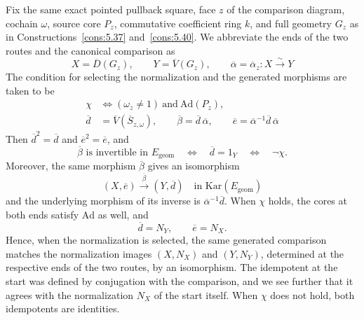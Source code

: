 \begin{theorem}\label{thm:6.16}

Fix the same exact pointed pullback square, face $z$ of the comparison diagram,
cochain $\omega$, source core $P_z$, commutative coefficient ring $k$, and
full geometry $G_z$ as in Constructions~\ref{cons:5.37} and~\ref{cons:5.40}.
We abbreviate the ends of the two routes and the canonical comparison as
\begin{equation*}
X=\overline D(G_z),\qquad Y=\overline V(G_z),\qquad
\overline\alpha=\overline\alpha_z:X\xrightarrow{\sim}Y
\tag{6.19}\label{eq:6.19}
\end{equation*}
The condition for selecting the normalization and the generated morphisms are taken to be
\begin{equation*}
\begin{aligned}
\chi&\Longleftrightarrow
   (\omega_z\ne1)\ \text{and}\ \mathrm{Ad}(P_z),\\
\overline d&=\overline V(\overline S_{z,\omega}),\qquad
\overline\beta=\overline d\,\overline\alpha,\qquad
\overline e=\overline\alpha^{-1}\overline d\,\overline\alpha
\end{aligned}
\tag{6.20}\label{eq:6.20}
\end{equation*}
Then $\overline d^2=\overline d$ and $\overline e^2=\overline e$, and
\begin{equation*}
\overline\beta\text{ is invertible in }E_{\mathrm{geom}}\text{}
\quad\Longleftrightarrow\quad
\overline d=1_Y
\quad\Longleftrightarrow\quad
\neg\chi.
\tag{6.21}\label{eq:6.21}
\end{equation*}
Moreover, the same morphism $\overline\beta$ gives an isomorphism
\begin{equation*}
(X,\overline e)\xrightarrow{\ \overline\beta\ }(Y,\overline d)
\quad\text{in }\mathrm{Kar}(E_{\mathrm{geom}})
\tag{6.22}\label{eq:6.22}
\end{equation*}
and the underlying morphism of its inverse is $\overline\alpha^{-1}\overline d$.
When $\chi$ holds, the cores at both ends satisfy $\mathrm{Ad}$ as well, and
\begin{equation*}
\overline d=N_Y,\qquad \overline e=N_X.
\tag{6.23}\label{eq:6.23}
\end{equation*}
Hence, when the normalization is selected, the same generated comparison matches the
normalization images $(X,N_X)$ and $(Y,N_Y)$, determined at the respective ends of the
two routes, by an isomorphism.
The idempotent at the start was defined by conjugation with the comparison, and we see
further that it agrees with the normalization $N_X$ of the start itself.
When $\chi$ does not hold, both idempotents are identities.

\end{theorem}

